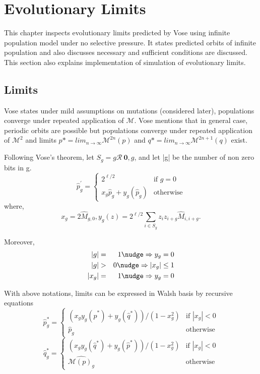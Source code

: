 \chapter{Evolutionary Limits} \label{ch:evolutionary limits}
This chapter inspects evolutionary limits predicted by Vose using infinite population model under no selective pressure. It states predicted orbits of infinite population and also discusses necessary and sufficient conditions are discussed. This section also explains implementation of simulation of evolutionary limits.

\section{Limits}
Vose states under mild assumptions on mutations (considered later), populations converge under repeated application of $\mathcal{M}$. Vose mentions that in general case, periodic orbits are possible but populations converge under repeated application of $\mathcal{M}^2$ and limits $p\ast = lim_{n \rightarrow \infty} \mathcal{M}^{2n}(p)$ and $q\ast = lim_{n \rightarrow \infty} \mathcal{M}^{2n+1}(q)$ exist.

Following Vose's theorem, let $S_g = g \mathcal{R} \ {\textbf{0}, g}$, and let |g| be the number of non zero bits in g.
\[
\widehat{p}^{\prime}_g  = \begin{cases}
    2^{\ell /2}  & \text{if $g = 0$}\\
    x_g \widehat{p}_g + y_g(\widehat{p}_g) & \text{otherwise}
  \end{cases}
\]
where,
\[
x_g = 2\widehat{M}_{g,0},  y_g(z) = 2^{\ell /2} \sum_{i \in S_g} z_i z_{i+g} \widehat{M}_{i,i+g}.
\]

Moreover, 
\begin{eqnarray*}
|g| & = & 1 \nudge \Rightarrow y_g = 0 \\
|g| & > & 0 \nudge \Rightarrow |x_g| \leq 1 \\
|x_g| & = & 1 \nudge \Rightarrow y_g = 0
\end{eqnarray*}

With above notations, limits can be expressed in Walsh basis by recursive equations 
\begin{equation}
\label{lt1}
\widehat{p}^{\ast}_g  = \begin{cases}
    (x_g y_g(\widehat{p}^{\ast}) + y_g(\widehat{q}^{\ast}))/(1-x_g^2)  & \text{if $|x_g| < 0$}\\
    \widehat{p}_g  & \text{otherwise}
  \end{cases}
\end{equation}
\begin{equation}
\label{lt2}
\widehat{q}^{\ast}_g  = \begin{cases}
    (x_g y_g(\widehat{q}^{\ast}) + y_g(\widehat{p}^{\ast}))/(1-x_g^2)  & \text{if $|x_g| < 0$}\\
    \widehat{\mathcal{M}(p)_g}  & \text{otherwise}
  \end{cases}
\end{equation}

